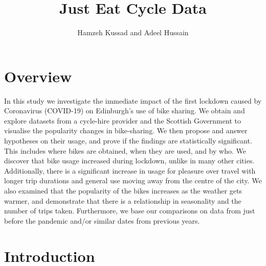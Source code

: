 \documentclass[11pt,a4paper]{article}
\title{Just Eat Cycle Data}
\author{Hamzeh Kussad and Adeel Hussain}
\begin{document}
\maketitle


\section{Overview}
In this study we investigate the immediate impact of the first lockdown caused by Coronavirus (COVID-19) on Edinburgh’s use of bike sharing. We obtain and explore datasets from a cycle-hire provider and the Scottish Government to visualise the popularity changes in bike-sharing. We then propose and answer hypotheses on their usage, and prove if the findings are statistically significant. This includes where bikes are obtained, when they are used, and by who. We discover that bike usage increased during lockdown, unlike in many other cities. Additionally, there is a significant increase in usage for pleasure over travel with longer trip durations and general use moving away from the centre of the city. We also examined that the popularity of the bikes increases as the weather gets warmer, and demonstrate that there is a relationship in seasonality and the number of trips taken. Furthermore, we base our comparisons on data from just before the pandemic and/or similar dates from previous years.

\section{Introduction}
\end{document}
